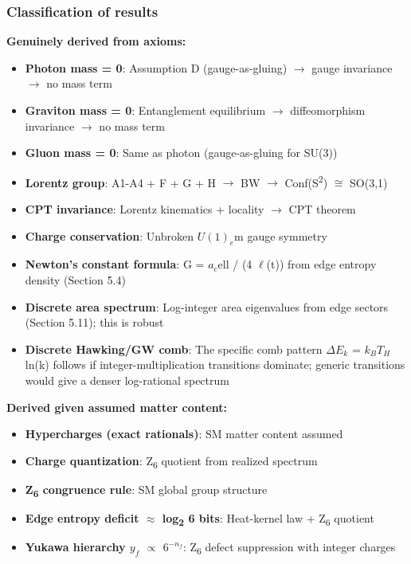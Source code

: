 \documentclass[11pt,a4paper]{article}
\theoremstyle{remark}
\providecommand{\tightlist}{%
  \setlength{\itemsep}{0pt}\setlength{\parskip}{0pt}}
\begin{document}
\subsubsection{Classification of results}\label{classification-of-results}

\textbf{Genuinely derived from axioms:}

\begin{itemize}
\tightlist
\item
  \textbf{Photon mass = 0}: Assumption D (gauge-as-gluing) \ensuremath{\to} gauge invariance \ensuremath{\to} no mass term
\item
  \textbf{Graviton mass = 0}: Entanglement equilibrium \ensuremath{\to} diffeomorphism invariance \ensuremath{\to} no mass term
\item
  \textbf{Gluon mass = 0}: Same as photon (gauge-as-gluing for SU(3))
\item
  \textbf{Lorentz group}: A1-A4 + F + G + H \ensuremath{\to} BW \ensuremath{\to} Conf(S\textsuperscript{2}) \ensuremath{\cong} SO(3,1)
\item
  \textbf{CPT invariance}: Lorentz kinematics + locality \ensuremath{\to} CPT theorem
\item
  \textbf{Charge conservation}: Unbroken \(U(1)_e\)m gauge symmetry
\item
  \textbf{Newton's constant formula}: G = \(a_c\)ell / (4 \ensuremath{\ell}(t)) from edge entropy density (Section 5.4)
\item
  \textbf{Discrete area spectrum}: Log-integer area eigenvalues from edge sectors (Section 5.11); this is robust
\item
  \textbf{Discrete Hawking/GW comb}: The specific comb pattern \(\ensuremath{\Delta}E_k\) = \(k_B T_H\) ln(k) follows if integer-multiplication transitions dominate; generic transitions would give a denser log-rational spectrum
\end{itemize}

\textbf{Derived given assumed matter content:}

\begin{itemize}
\tightlist
\item
  \textbf{Hypercharges (exact rationals)}: SM matter content assumed
\item
  \textbf{Charge quantization}: Z\textsubscript{6} quotient from realized spectrum
\item
  \textbf{Z\textsubscript{6} congruence rule}: SM global group structure
\item
  \textbf{Edge entropy deficit \ensuremath{\approx} log\textsubscript{2} 6 bits}: Heat-kernel law + Z\textsubscript{6} quotient
\item
  \textbf{Yukawa hierarchy \(y_f\) \ensuremath{\propto} \(6^{-n_f}\)}: Z\textsubscript{6} defect suppression with integer charges
\end{itemize}
\end{document}
